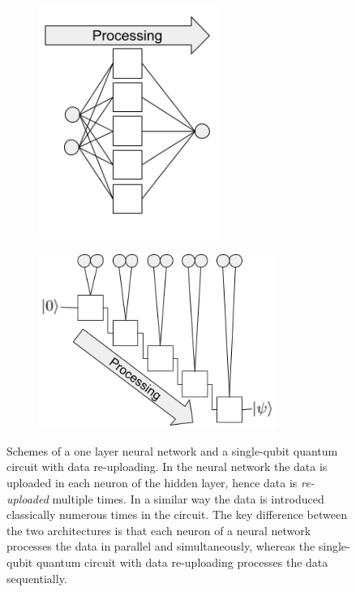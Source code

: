 \begin{figure}[h]
    \centering
    \begin{subfigure}[b]{0.45\textwidth}
        \centering
        \includegraphics[width=0.65\textwidth]{sections/chapters/Quantum-Machine-Learning/Images/Neural_network.png}
    \end{subfigure}
    \begin{subfigure}[b]{0.45\textwidth}
        \centering
        \includegraphics[width=0.85\textwidth]{sections/chapters/Quantum-Machine-Learning/Images/Quantum_scheme.png}
    \end{subfigure}
    \caption{Schemes of a one layer neural network and a single-qubit quantum circuit with data re-uploading.
    In the neural network the data is uploaded in each neuron of the hidden layer, hence data is 
    \textit{re-uploaded} multiple times.
    In a similar way the data is introduced classically numerous times in the circuit.
    The key difference between the two architectures is that each neuron of a neural network processes the 
    data in parallel and simultaneously, whereas the single-qubit quantum circuit with data re-uploading 
    processes the data sequentially.}
    \label{fig:data-reuploading-schemes}
\end{figure}



